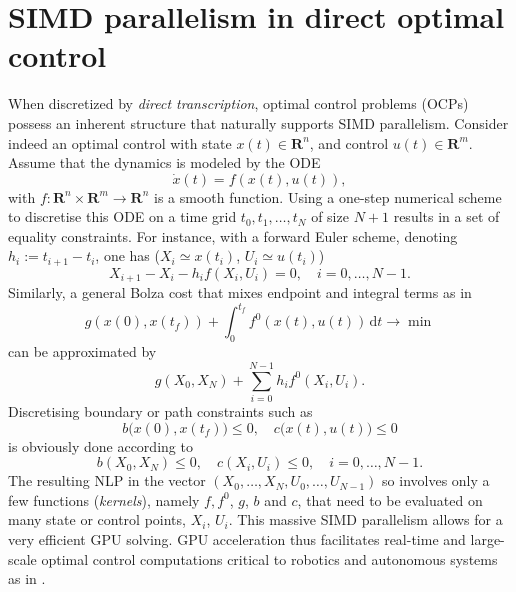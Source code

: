 \section{SIMD parallelism in direct optimal control} \label{s3}
When discretized by \emph{direct transcription}, optimal control problems (OCPs) possess an inherent structure that naturally supports SIMD parallelism. 
Consider indeed an optimal control with state $x(t) \in \mathbf{R}^n$, and control $u(t) \in \mathbf{R}^m$. Assume that the dynamics is modeled by the ODE
$$ \dot{x}(t) = f(x(t), u(t)), $$
with $f : \mathbf{R}^n \times \mathbf{R}^m \to \mathbf{R}^n$ is a smooth function. Using a one-step numerical scheme to discretise this ODE on a time grid $t_0, t_1, \dots, t_N$ of size $N + 1$ results in a set of equality constraints. For instance, with a forward Euler scheme, denoting $h_i := t_{i+1} - t_i$, one has ($X_i \simeq x(t_i)$, $U_i \simeq u(t_i)$)
$$ X_{i+1} - X_i - h_i f(X_i, U_i) = 0,\quad i = 0, \dots, N-1. $$
Similarly, a general Bolza cost that mixes endpoint and integral terms as in
$$ g(x(0), x(t_f)) + \int_0^{t_f} f^0(x(t), u(t))\,\mathrm{d}t \to \min $$
can be approximated by
$$ g(X_0, X_N) + \sum_{i=0}^{N-1} h_i f^0(X_i, U_i). $$
Discretising boundary or path constraints such as
$$ b\big(x(0),x(t_f)\big) \leq 0,\quad c\big(x(t), u(t)\big) \leq 0 $$
is obviously done according to
$$ b(X_0, X_N) \leq 0, \quad c(X_i, U_i) \leq 0,\quad i = 0, \dots, N-1. $$
The resulting NLP in the vector $(X_0,\dots,X_N,U_0,\dots,U_{N-1})$
so involves only a few functions (\emph{kernels}), namely $f, f^0$, $g$, $b$ and $c$, that need to be evaluated on many state or control points, $X_i$, $U_i$.
This massive SIMD parallelism allows for a very efficient GPU solving. GPU acceleration thus facilitates real-time and large-scale optimal control computations critical to robotics and autonomous systems as in \cite{pacaud2024gpu}.


